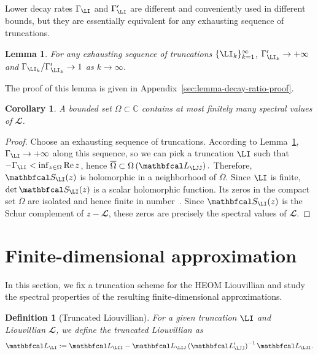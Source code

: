 \documentclass{SciPost}
\renewcommand{\Re}{\operatorname{Re}}
\newtheorem{lemma}{Lemma}
\newtheorem{corollary}{Corollary}
\newtheorem{definition}{Definition}
\begin{document}
Lower decay rates $\Gamma_\LI$ and $\Gamma_\LI'$ are different and conveniently used in different bounds, but they are essentially equivalent for any exhausting sequence of truncations.
\begin{lemma}
    For any exhausting sequence of truncations \(\{\LI_k\}_{k=1}^\infty\), $\Gamma'_{\LI_k} \to +\infty$ and $\Gamma_{\LI_k} / \Gamma'_{\LI_k} \to 1$ as $k \to \infty$.
    \label{lemma:decay-ratio}
\end{lemma}
The proof of this lemma is given in Appendix~\ref{sec:lemma-decay-ratio-proof}.

\begin{corollary}
    A bounded set \(\Omega \subset \mathbb C\) contains at most finitely many spectral values of \(\mathbfcal L\).
    \label{lemma:spectrum-discreteness}
\end{corollary}
\begin{proof}
    Choose an exhausting sequence of truncations. According to Lemma~\ref{lemma:decay-ratio}, $\Gamma_\LI \to +\infty$ along this sequence, so we can pick a truncation \(\LI\) such that
       $ -\Gamma_\LI < \inf_{z \in \Omega} \Re z$, 
    hence
    $
        \overline{\Omega}
        \subset
        \Omega\left(\mathbfcal L_\LJJ\right).
    $
    Therefore, \(\mathbfcal S_\LI(z)\) is holomorphic in a neighborhood of \(\overline{\Omega}\). Since \(\LI\) is finite, \(\det \mathbfcal S_\LI(z)\) is a scalar holomorphic function. Its zeros in the compact set \(\overline{\Omega}\) are isolated and hence finite in number~\cite{Ablowitz2003}. Since $\mathbfcal S_\LI(z)$ is the Schur complement of $z - \mathbfcal L$, these zeros are precisely the spectral values of \(\mathbfcal L\).
\end{proof}

\section{Finite-dimensional approximation}
\label{sec:truncation}

In this section, we fix a truncation scheme for the HEOM Liouvillian and study the spectral properties of the resulting finite-dimensional approximations.
\begin{definition}[Truncated Liouvillian]
    For a given truncation \(\LI\) and Liouvillian $\mathbfcal L$, we define the \emph{truncated Liouvillian} as
\begin{equation}
    \mathbfcal L_\LI
    :=
    \mathbfcal L_\LII
    -
    \mathbfcal L_\LIJ
    \left(\mathbfcal L'_\LJJ\right)^{-1}
    \mathbfcal L_\LJI.
\end{equation}
    \label{def:truncated-liouvillian}
\end{definition}
\end{document}
